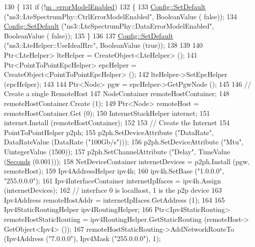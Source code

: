 \begin{DoxyCode}
130 \{
131   \textcolor{keywordflow}{if} (!\hyperlink{classns3_1_1LenaDeactivateBearerTestCase_a3ec449d8bd99571df63d3fd1360d77a1}{m\_errorModelEnabled})
132     \{
133       \hyperlink{group__config_ga2e7882df849d8ba4aaad31c934c40c06}{Config::SetDefault} (\textcolor{stringliteral}{"ns3::LteSpectrumPhy::CtrlErrorModelEnabled"}, BooleanValue (\textcolor{keyword}{
      false}));
134       \hyperlink{group__config_ga2e7882df849d8ba4aaad31c934c40c06}{Config::SetDefault} (\textcolor{stringliteral}{"ns3::LteSpectrumPhy::DataErrorModelEnabled"}, BooleanValue (\textcolor{keyword}{
      false}));
135     \}
136 
137   \hyperlink{group__config_ga2e7882df849d8ba4aaad31c934c40c06}{Config::SetDefault} (\textcolor{stringliteral}{"ns3::LteHelper::UseIdealRrc"}, BooleanValue (\textcolor{keyword}{true}));
138 
139 
140   Ptr<LteHelper> lteHelper = CreateObject<LteHelper> ();
141   Ptr<PointToPointEpcHelper>  epcHelper = CreateObject<PointToPointEpcHelper> ();
142   lteHelper->SetEpcHelper (epcHelper);
143 
144   Ptr<Node> pgw = epcHelper->GetPgwNode ();
145 
146   \textcolor{comment}{// Create a single RemoteHost}
147   NodeContainer remoteHostContainer;
148   remoteHostContainer.Create (1);
149   Ptr<Node> remoteHost = remoteHostContainer.Get (0);
150   InternetStackHelper internet;
151   internet.Install (remoteHostContainer);
152 
153   \textcolor{comment}{// Create the Internet}
154   PointToPointHelper p2ph;
155   p2ph.SetDeviceAttribute (\textcolor{stringliteral}{"DataRate"}, DataRateValue (DataRate (\textcolor{stringliteral}{"100Gb/s"})));
156   p2ph.SetDeviceAttribute (\textcolor{stringliteral}{"Mtu"}, UintegerValue (1500));
157   p2ph.SetChannelAttribute (\textcolor{stringliteral}{"Delay"}, TimeValue (\hyperlink{group__timecivil_ga33c34b816f8ff6628e33d5c8e9713b9e}{Seconds} (0.001)));
158   NetDeviceContainer internetDevices = p2ph.Install (pgw, remoteHost);
159   Ipv4AddressHelper ipv4h;
160   ipv4h.SetBase (\textcolor{stringliteral}{"1.0.0.0"}, \textcolor{stringliteral}{"255.0.0.0"});
161   Ipv4InterfaceContainer internetIpIfaces = ipv4h.Assign (internetDevices);
162   \textcolor{comment}{// interface 0 is localhost, 1 is the p2p device}
163   Ipv4Address remoteHostAddr = internetIpIfaces.GetAddress (1);
164 
165   Ipv4StaticRoutingHelper ipv4RoutingHelper;
166   Ptr<Ipv4StaticRouting> remoteHostStaticRouting = ipv4RoutingHelper.GetStaticRouting (remoteHost->
      GetObject<Ipv4> ());
167   remoteHostStaticRouting->AddNetworkRouteTo (Ipv4Address (\textcolor{stringliteral}{"7.0.0.0"}), Ipv4Mask (\textcolor{stringliteral}{"255.0.0.0"}), 1);

\end{DoxyCode}

